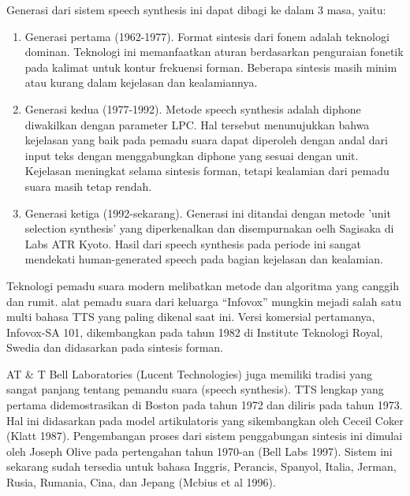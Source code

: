 Generasi dari sistem speech synthesis ini dapat dibagi ke dalam 3 masa, yaitu:

\begin{enumerate}
\item Generasi pertama (1962-1977). Format sintesis dari fonem adalah teknologi dominan. Teknologi ini memanfaatkan aturan berdasarkan penguraian fonetik pada kalimat untuk kontur frekuensi forman. Beberapa sintesis masih minim atau kurang dalam kejelasan dan kealamiannya.
\item Generasi kedua (1977-1992). Metode speech synthesis adalah diphone diwakilkan dengan parameter LPC. Hal tersebut menunujukkan bahwa kejelasan yang baik pada pemadu suara dapat diperoleh dengan andal dari input teks dengan menggabungkan diphone yang sesuai dengan unit. Kejelasan meningkat selama sintesis forman, tetapi kealamian dari pemadu suara masih tetap rendah.
\item Generasi ketiga (1992-sekarang). Generasi ini ditandai dengan metode 'unit selection synthesis' yang diperkenalkan dan disempurnakan oelh Sagisaka di Labs ATR Kyoto. Hasil dari speech synthesis pada periode ini sangat mendekati human-generated speech pada bagian kejelasan dan kealamian.
\end{enumerate}

Teknologi pemadu suara modern melibatkan metode dan algoritma yang canggih dan rumit. alat pemadu suara dari keluarga “Infovox” mungkin mejadi salah satu multi bahasa TTS yang paling dikenal saat ini. Versi komersial pertamanya, Infovox-SA 101, dikembangkan pada tahun 1982 di Institute Teknologi Royal, Swedia dan didasarkan pada sintesis forman.

AT \& T Bell Laboratories (Lucent Technologies) juga memiliki tradisi yang sangat panjang tentang pemandu suara (speech synthesis). TTS lengkap yang pertama didemostrasikan di Boston pada tahun 1972 dan diliris pada tahun 1973. Hal ini didasarkan pada model artikulatoris yang sikembangkan oleh Ceceil Coker (Klatt 1987). Pengembangan proses dari sistem penggabungan sintesis ini dimulai oleh Joseph Olive pada pertengahan tahun 1970-an (Bell Labs 1997). Sistem ini sekarang sudah tersedia untuk bahasa Inggris, Perancis, Spanyol, Italia, Jerman, Rusia, Rumania, Cina, dan Jepang (Mcbius et al 1996).

